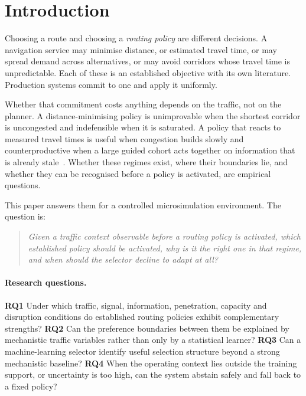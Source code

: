 \section{Introduction}

Choosing a route and choosing a \emph{routing policy} are different decisions.
A navigation service may minimise distance, or estimated travel time, or may
spread demand across alternatives, or may avoid corridors whose travel time is
unpredictable. Each of these is an established objective with its own
literature. Production systems commit to one and apply it uniformly.

Whether that commitment costs anything depends on the traffic, not on the
planner. A distance-minimising policy is unimprovable when the shortest
corridor is uncongested and indefensible when it is saturated. A policy that
reacts to measured travel times is useful when congestion builds slowly and
counterproductive when a large guided cohort acts together on information that
is already stale~\cite{arnott1991information,acemoglu2018braess}. Whether these
regimes exist, where their boundaries lie, and whether they can be recognised
before a policy is activated, are empirical questions.

This paper answers them for a controlled microsimulation environment. The
question is:

\begin{quote}
\emph{Given a traffic context observable before a routing policy is activated,
which established policy should be activated, why is it the right one in that
regime, and when should the selector decline to adapt at all?}
\end{quote}

\paragraph{Research questions.}
\textbf{RQ1} Under which traffic, signal, information, penetration, capacity and
disruption conditions do established routing policies exhibit complementary
strengths?
\textbf{RQ2} Can the preference boundaries between them be explained by
mechanistic traffic variables rather than only by a statistical learner?
\textbf{RQ3} Can a machine-learning selector identify useful selection structure
beyond a strong mechanistic baseline?
\textbf{RQ4} When the operating context lies outside the training support, or
uncertainty is too high, can the system abstain safely and fall back to a fixed
policy?

